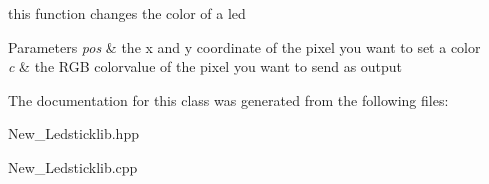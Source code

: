 this function changes the color of a led 


\begin{DoxyParams}{Parameters}
{\em pos} & the x and y coordinate of the pixel you want to set a color \\
\hline
{\em c} & the R\+GB colorvalue of the pixel you want to send as output \\
\hline
\end{DoxyParams}


The documentation for this class was generated from the following files\+:\begin{DoxyCompactItemize}
\item 
New\+\_\+\+Ledsticklib.\+hpp\item 
New\+\_\+\+Ledsticklib.\+cpp\end{DoxyCompactItemize}
